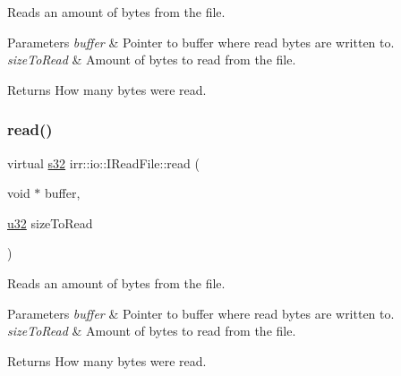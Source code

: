 Reads an amount of bytes from the file. 


\begin{DoxyParams}{Parameters}
{\em buffer} & Pointer to buffer where read bytes are written to. \\
\hline
{\em size\+To\+Read} & Amount of bytes to read from the file. \\
\hline
\end{DoxyParams}
\begin{DoxyReturn}{Returns}
How many bytes were read. 
\end{DoxyReturn}
\mbox{\label{classirr_1_1io_1_1IReadFile_ab51878d36bc9dd3964b664055fbeb13f}} 
\subsubsection{\texorpdfstring{read()}{read()}\hspace{0.1cm}{\footnotesize\ttfamily [2/2]}}
{\footnotesize\ttfamily virtual \hyperlink{namespaceirr_ac66849b7a6ed16e30ebede579f9b47c6}{s32} irr\+::io\+::\+I\+Read\+File\+::read (\begin{DoxyParamCaption}\item[{void $\ast$}]{buffer,  }\item[{\hyperlink{namespaceirr_a0416a53257075833e7002efd0a18e804}{u32}}]{size\+To\+Read }\end{DoxyParamCaption})\hspace{0.3cm}{\ttfamily [pure virtual]}}



Reads an amount of bytes from the file. 


\begin{DoxyParams}{Parameters}
{\em buffer} & Pointer to buffer where read bytes are written to. \\
\hline
{\em size\+To\+Read} & Amount of bytes to read from the file. \\
\hline
\end{DoxyParams}
\begin{DoxyReturn}{Returns}
How many bytes were read. 
\end{DoxyReturn}
\mbox{\label{classirr_1_1io_1_1IReadFile_ac1cd81f18832e8703838d7abd495bf34}} 
